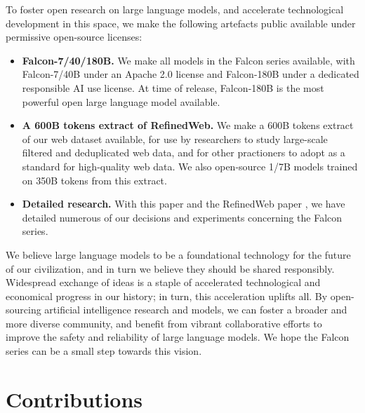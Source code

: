 \documentclass{article}
\begin{document}
To foster open research on large language models, and accelerate technological development in this space, we make the following artefacts public available under permissive open-source licenses:

\begin{itemize}
    \item \textbf{Falcon-7/40/180B.} We make all models in the Falcon series available, with Falcon-7/40B under an Apache 2.0 license and Falcon-180B under a dedicated responsible AI use license. At time of release, Falcon-180B is the most powerful open large language model available.
    \item \textbf{A 600B tokens extract of RefinedWeb.} We make a 600B tokens extract of our web dataset available, for use by researchers to study large-scale filtered and deduplicated web data, and for other practioners to adopt as a standard for high-quality web data. We also open-source 1/7B models trained on 350B tokens from this extract.
    \item \textbf{Detailed research.} With this paper and the RefinedWeb paper \citep{refinedweb}, we have detailed numerous of our decisions and experiments concerning the Falcon series.
\end{itemize}

We believe large language models to be a foundational technology for the future of our civilization, and in turn we believe they should be  shared responsibly. Widespread exchange of ideas is a staple of accelerated technological and economical progress in our history; in turn, this acceleration uplifts all. By open-sourcing artificial intelligence research and models, we can foster a broader and more diverse community, and benefit from vibrant collaborative efforts to improve the safety and reliability of large language models. We hope the Falcon series can be a small step towards this vision.

    

\newpage




\appendix

\newpage

\section{Contributions}
\label{sec:contributions}
\end{document}
